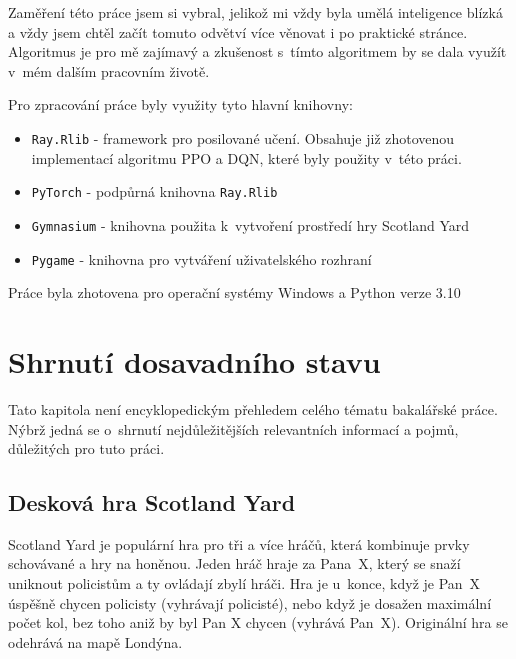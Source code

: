 Zaměření této práce jsem si vybral, jelikož mi vždy byla umělá inteligence blízká a vždy jsem chtěl začít tomuto odvětví více věnovat i po praktické stránce.
Algoritmus je pro mě zajímavý a zkušenost s~tímto algoritmem by se dala využít v~mém dalším pracovním životě.\newpage

Pro zpracování práce byly využity tyto hlavní knihovny:
\begin{itemize}
  \item \texttt{Ray.Rlib} - framework pro posilované učení. Obsahuje již zhotovenou implementací algoritmu PPO a DQN, které byly použity v~této práci. 
  \item \texttt{PyTorch} - podpůrná knihovna \texttt{Ray.Rlib}
  \item \texttt{Gymnasium} - knihovna použita k~vytvoření prostředí hry Scotland Yard
  \item \texttt{Pygame} - knihovna pro vytváření uživatelského rozhraní
\end{itemize}

Práce byla zhotovena pro operační systémy Windows a Python verze 3.10

\chapter{Shrnutí dosavadního stavu}
\label{ch:dosavadni_stav}
Tato kapitola není encyklopedickým přehledem celého tématu bakalářské práce.
Nýbrž jedná se o~shrnutí nejdůležitějších relevantních informací a pojmů, důležitých pro tuto práci.

\section{Desková hra Scotland Yard}
\label{sec:deskova-hra-scotland-yard}

Scotland Yard je populární hra pro tři a více hráčů, která kombinuje prvky schovávané a hry na honěnou.
Jeden hráč hraje za Pana~X, který se snaží uniknout policistům a ty ovládají zbylí hráči.
Hra je u~konce, když je Pan~X úspěšně chycen policisty (vyhrávají policisté), nebo když je dosažen maximální počet kol, bez toho aniž by byl Pan X chycen (vyhrává Pan~X).
Originální hra se odehrává na mapě Londýna.

